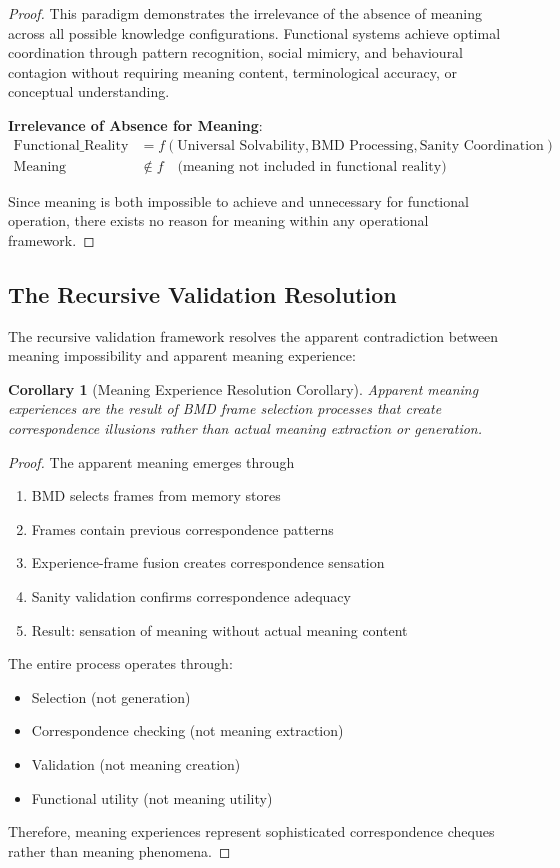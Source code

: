 \documentclass[12pt,a4paper]{article}
\newtheorem{corollary}[theorem]{Corollary}
\begin{document}
\begin{proof}
This paradigm demonstrates the irrelevance of the absence of meaning across all possible knowledge configurations. Functional systems achieve optimal coordination through pattern recognition, social mimicry, and behavioural contagion without requiring meaning content, terminological accuracy, or conceptual understanding.

\textbf{Irrelevance of Absence for Meaning}:
\begin{align}
\text{Functional\_Reality} &= f(\text{Universal Solvability}, \text{BMD Processing}, \text{Sanity Coordination}) \\
\text{Meaning} &\notin f \quad \text{(meaning not included in functional reality)}
\end{align}

Since meaning is both impossible to achieve and unnecessary for functional operation, there exists no reason for meaning within any operational framework.
\end{proof}

\subsection{The Recursive Validation Resolution}

The recursive validation framework resolves the apparent contradiction between meaning impossibility and apparent meaning experience:

\begin{corollary}[Meaning Experience Resolution Corollary]
Apparent meaning experiences are the result of BMD frame selection processes that create correspondence illusions rather than actual meaning extraction or generation.
\end{corollary}

\begin{proof}
The apparent meaning emerges through
\begin{enumerate}
\item BMD selects frames from memory stores
\item Frames contain previous correspondence patterns
\item Experience-frame fusion creates correspondence sensation
\item Sanity validation confirms correspondence adequacy
\item Result: sensation of meaning without actual meaning content
\end{enumerate}

The entire process operates through:
\begin{itemize}
\item Selection (not generation)
\item Correspondence checking (not meaning extraction)
\item Validation (not meaning creation)
\item Functional utility (not meaning utility)
\end{itemize}

Therefore, meaning experiences represent sophisticated correspondence cheques rather than meaning phenomena.
\end{proof}
\end{document}
